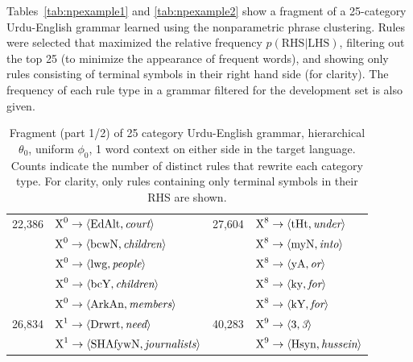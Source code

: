 Tables~\ref{tab:npexample1} and \ref{tab:npexample2} show a fragment of a 25-category Urdu-English grammar learned using the nonparametric phrase clustering.  Rules were selected that maximized the relative frequency $p(\textrm{RHS}|\textrm{LHS})$, filtering out the top 25 (to minimize the appearance of frequent words), and showing only rules consisting of terminal symbols in their right hand side (for clarity). The frequency of each rule type in a grammar filtered for the development set is also given.

\begin{table}[h]
\caption{Fragment (part 1/2) of 25 category Urdu-English grammar, hierarchical $\theta_0$, uniform $\phi_0$, 1 word context on either side in the target language. Counts indicate the number of distinct rules that rewrite each category type. For clarity, only rules containing only terminal symbols in their RHS are shown.}
\begin{center}
\begin{tabular}{|c|l|c|l|}
\hline
22,386 & $ \textrm{X}^{0} \rightarrow \langle \textrm{EdAlt},\textrm{{\emph court}} \rangle $ &27,604 & $ \textrm{X}^{8} \rightarrow \langle \textrm{tHt},\textrm{{\emph under}} \rangle $ \\
 & $ \textrm{X}^{0} \rightarrow \langle \textrm{bcwN},\textrm{{\emph children}} \rangle $ & & $ \textrm{X}^{8} \rightarrow \langle \textrm{myN},\textrm{{\emph into}} \rangle $ \\
 & $ \textrm{X}^{0} \rightarrow \langle \textrm{lwg},\textrm{{\emph people}} \rangle $ & & $ \textrm{X}^{8} \rightarrow \langle \textrm{yA},\textrm{{\emph or}} \rangle $ \\
 & $ \textrm{X}^{0} \rightarrow \langle \textrm{bcY},\textrm{{\emph children}} \rangle $ & & $ \textrm{X}^{8} \rightarrow \langle \textrm{ky},\textrm{{\emph for}} \rangle $ \\
 & $ \textrm{X}^{0} \rightarrow \langle \textrm{ArkAn},\textrm{{\emph members}} \rangle $ & & $ \textrm{X}^{8} \rightarrow \langle \textrm{kY},\textrm{{\emph for}} \rangle $ \\
\hline
26,834 & $ \textrm{X}^{1} \rightarrow \langle \textrm{Drwrt},\textrm{{\emph need}} \rangle $ &40,283 & $ \textrm{X}^{9} \rightarrow \langle \textrm{3},\textrm{{\emph 3}} \rangle $ \\
 & $ \textrm{X}^{1} \rightarrow \langle \textrm{SHAfywN},\textrm{{\emph journalists}} \rangle $ & & $ \textrm{X}^{9} \rightarrow \langle \textrm{Hsyn},\textrm{{\emph hussein}} \rangle $ \\

\end{tabular}
\end{center}
\end{table}
